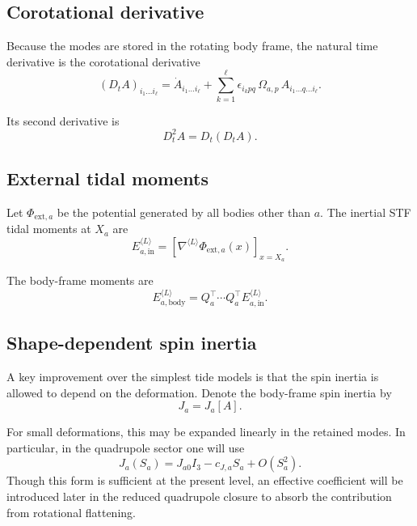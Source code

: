 \documentclass[journal, a4paper]{IEEEtran}
\begin{document}
\subsection{Corotational derivative}

Because the modes are stored in the rotating body frame, the natural time
derivative is the corotational derivative
\begin{equation}
(D_t A)_{i_1\dots i_\ell}
=
\dot A_{i_1\dots i_\ell}
+
\sum_{k=1}^{\ell}
\epsilon_{i_k p q}\,
\Omega_{a,p}\,
A_{i_1\dots q \dots i_\ell}.
\label{eq:DtA}
\end{equation}

Its second derivative is
\begin{equation}
D_t^2 A = D_t(D_t A).
\label{eq:Dt2A}
\end{equation}

\subsection{External tidal moments}

Let $\Phi_{\mathrm{ext},a}$ be the potential generated by all bodies other
than $a$. The inertial STF tidal moments at $X_a$ are
\begin{equation}
E_{a,\mathrm{in}}^{\langle L\rangle}
=
\left[
\nabla^{\langle L\rangle}
\Phi_{\mathrm{ext},a}(x)
\right]_{x=X_a}.
\label{eq:E-in-full}
\end{equation}

The body-frame moments are
\begin{equation}
E_{a,\mathrm{body}}^{\langle L\rangle}
=
Q_a^{\top}\cdots Q_a^{\top}
E_{a,\mathrm{in}}^{\langle L\rangle}.
\label{eq:E-body-full}
\end{equation}

\subsection{Shape-dependent spin inertia}

A key improvement over the simplest tide models is that the spin inertia is
allowed to depend on the deformation. Denote the body-frame spin inertia by
\begin{equation}
J_a = J_a[A].
\label{eq:J-of-A}
\end{equation}

For small deformations, this may be expanded linearly in the retained modes.
In particular, in the quadrupole sector one will use
\begin{equation}
J_a(S_a)
=
J_{a0} I_3 - c_{J,a} S_a + O(S_a^2).
\label{eq:Jlinear}
\end{equation}
Though this form is sufficient at the present level, an effective coefficient
will be introduced later in the reduced quadrupole closure to absorb the
contribution from rotational flattening.
\end{document}
